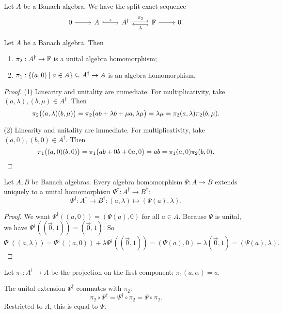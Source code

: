 \begin{lemma}
Let $A$ be a Banach algebra. We have the split exact sequence
\[ \begin{tikzcd}
0 \rar & A \rar[hook, "\iota"] & A^\dagger \rar[shift left, "\pi_2"] & \lar[hook, shift left, "\lambda"] \F \rar & 0.
\end{tikzcd} \]
\end{lemma}

\begin{lemma} \label{unitalProjectionsAlgebraHomomorphisms}
Let $A$ be a Banach algebra. Then
\begin{enumerate}
\item $\pi_2: A^\dagger \to \mathbb{F}$ is a unital algebra homomorphism;
\item $\proj_1: \setbuilder{(a,0)}{a\in A}\subseteq A^\dagger \to A$ is an algebra homomorphism.
\end{enumerate}
\end{lemma}
\begin{proof}
(1) Linearity and unitality are immediate. For multiplicativity, take $(a,\lambda), (b, \mu)\in A^\dagger$. Then
\[ \pi_2\big((a,\lambda)(b, \mu)\big) = \pi_2\big(ab+\lambda b + \mu a, \lambda\mu\big) = \lambda\mu = \pi_2(a,\lambda)\pi_2(b,\mu). \]

(2) Linearity and unitality are immediate. For multiplicativity, take $(a,0), (b, 0)\in A^\dagger$. Then
\[ \pi_1\big((a,0)(b, 0)\big) = \pi_1\big(ab+0 b + 0 a, 0\big) = ab = \pi_1(a,0)\pi_2(b,0). \]
\end{proof}

\begin{lemma}
Let $A,B$ be Banach algebras. Every algebra homomorphism $\Psi:A\to B$ extends uniquely to a unital homomorphism $\Psi^\dagger: A^\dagger \to B^\dagger$:
\[ \Psi^\dagger: A^\dagger \to B^\dagger: (a,\lambda) \mapsto (\Psi(a),\lambda). \]
\end{lemma}
\begin{proof}
We want $\Psi^\dagger((a,0)) = (\Psi(a),0)$ for all $a\in A$. Because $\Psi$ is unital, we have $\Psi^\dagger((\vec{0},1)) = (\vec{0},1)$. So
\[ \Psi^\dagger((a,\lambda)) = \Psi^\dagger((a,0))+\lambda \Psi^\dagger((\vec{0},1)) = (\Psi(a),0) + \lambda(\vec{0},1) = (\Psi(a),\lambda). \]
\end{proof}
\begin{corollary} \label{projectionOnACommutes}
Let $\pi_1: A^\dagger \to A$ be the projection on the first component: $\pi_1(a,\alpha) = a$.

The unital extension $\Psi^\dagger$ commutes with $\pi_2$:
\[ \pi_2\circ\Psi^\dagger = \Psi^\dagger \circ \pi_2 = \Psi\circ \pi_2. \]
Restricted to $A$, this is equal to $\Psi$.
\end{corollary}

